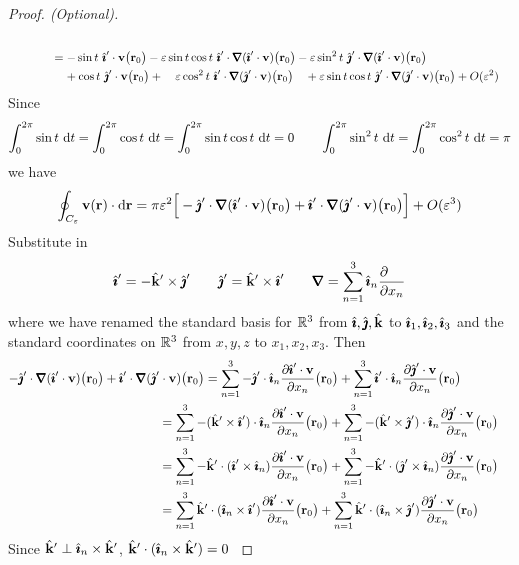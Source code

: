\begin{proof}[Proof. (Optional)]
{\begin{align*}
\\
&\hskip0.5in= -\sin t\ \hi'\cdot\vv\big(\vr_0\big)
-\veps\sin t\cos t\ \hi'\cdot\vnabla(\hi'\cdot\vv)\big(\vr_0\big)
 -\veps\sin^2 t\ \hj'\cdot\vnabla(\hi'\cdot\vv)\big(\vr_0\big)
   \\&\hskip0.5in\phantom{=\ }
+\cos t\ \hj'\cdot\vv\big(\vr_0\big)
+\ \ \ \veps\cos^2 t\ \hi'\cdot\vnabla(\hj'\cdot\vv)\big(\vr_0\big)\ \ \ 
+\veps\sin t\cos t\ \hj'\cdot\vnabla(\hj'\cdot\vv)\big(\vr_0\big)+O(\veps^2)
\end{align*}
Since
\begin{equation*}
\int_0^{2\pi}\sin t\ \dee{t}=\int_0^{2\pi}\cos t\ \dee{t}
=\int_0^{2\pi}\sin t\cos t\ \dee{t}=0\qquad
\int_0^{2\pi}\sin^2 t\ \dee{t}=\int_0^{2\pi}\cos^2 t\ \dee{t}=\pi
\end{equation*}
we have
\begin{equation*}
\oint_{C_\veps} \vv(\vr)\cdot \dee{\vr}
=\pi\veps^2\Big[-\hj'\cdot\vnabla(\hi'\cdot\vv)\big(\vr_0\big)
    +\hi'\cdot\vnabla(\hj'\cdot\vv)\big(\vr_0\big)\Big]+O(\veps^3)
\end{equation*}
Substitute in 
\begin{equation*}
\hi'=-\hk'\times \hj'\qquad
\hj'=\hk'\times \hi'\qquad
\vnabla=\sum_{n=1}^3\hi_n\frac{\partial\hfill}{\partial x_n}
\end{equation*}
where we have renamed the standard basis for $\mathbb{R}^3$ from $\hat{\pmb{\imath}},\hat{\pmb{\jmath}},\hat{\mathbf{k}}$
to $\hat{\pmb{\imath}}_1,\hat{\pmb{\imath}}_2,\hat{\pmb{\imath}}_3$ and the standard coordinates on $\mathbb{R}^3$ from $x,y,z$
to $x_1,x_2,x_3$. Then
\begin{align*}
-\hj'\cdot\vnabla(\hi'\cdot\vv)\big(\vr_0\big)+\hi'\cdot\vnabla(\hj'\cdot\vv)\big(\vr_0\big)
&=\sum_{n=1}^3 -\hj'\cdot\hi_n\frac{\partial \hi'\cdot\vv}
{\partial x_n}\big(\vr_0\big)
+\sum_{n=1}^3\hi'\cdot\hi_n\frac{\partial \hj'\cdot\vv}{\partial x_n}\big(\vr_0\big)\cr
&\hskip-.5in=\sum_{n=1}^3 -(\hk'\times \hi')\cdot\hi_n\frac{\partial \hi'\cdot\vv}
{\partial x_n}\big(\vr_0\big)
+\sum_{n=1}^3-(\hk'\times \hj')\cdot\hi_n\frac{\partial \hj'\cdot\vv}{\partial x_n}\big(\vr_0\big)\cr
&\hskip-.5in=\sum_{n=1}^3 -\hk'\cdot( \hi'\times\hi_n)\frac{\partial \hi'\cdot\vv}
{\partial x_n}\big(\vr_0\big)
+\sum_{n=1}^3-\hk'\cdot( \hj'\times\hi_n)\frac{\partial \hj'\cdot\vv}{\partial x_n}\big(\vr_0\big)\cr
&\hskip-.5in=\sum_{n=1}^3 \hk'\cdot( \hi_n\times\hi')\frac{\partial \hi'\cdot\vv}
{\partial x_n}\big(\vr_0\big)
+\sum_{n=1}^3\hk'\cdot( \hi_n\times\hj')\frac{\partial \hj'\cdot\vv}{\partial x_n}\big(\vr_0\big)\cr
\end{align*}
Since $\hat{\mathbf{k}}'\perp \hat{\pmb{\imath}}_n\times\hat{\mathbf{k}}'$,  $\hat{\mathbf{k}}'\cdot( \hat{\pmb{\imath}}_n\times\hat{\mathbf{k}}')=0$
}
\end{proof}
